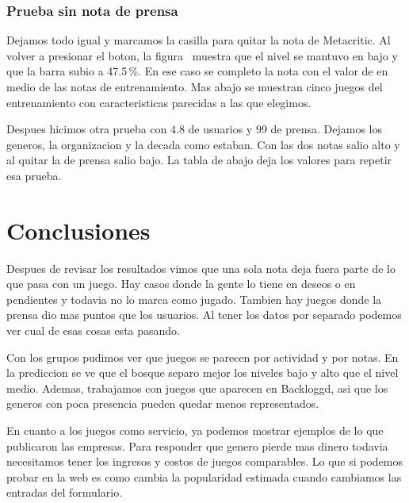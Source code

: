 
\subsubsection*{Prueba sin nota de prensa}
Dejamos todo igual y marcamos la casilla para quitar la nota de Metacritic. Al volver a presionar el boton, la figura~ muestra que el nivel se mantuvo en bajo y que la barra subio a 47.5\,\%. En ese caso se completo la nota con el valor de en medio de las notas de entrenamiento. Mas abajo se muestran cinco juegos del entrenamiento con caracteristicas parecidas a las que elegimos.


Despues hicimos otra prueba con 4.8 de usuarios y 99 de prensa. Dejamos los generos, la organizacion y la decada como estaban. Con las dos notas salio alto y al quitar la de prensa salio bajo. La tabla de abajo deja los valores para repetir esa prueba.

\EscenariosNotas

\section{Conclusiones}
Despues de revisar los resultados vimos que una sola nota deja fuera parte de lo que pasa con un juego. Hay casos donde la gente lo tiene en deseos o en pendientes y todavia no lo marca como jugado. Tambien hay juegos donde la prensa dio mas puntos que los usuarios. Al tener los datos por separado podemos ver cual de esas cosas esta pasando.

Con los grupos pudimos ver que juegos se parecen por actividad y por notas. En la prediccion se ve que el bosque separo mejor los niveles bajo y alto que el nivel medio. Ademas, trabajamos con juegos que aparecen en Backloggd, asi que los generos con poca presencia pueden quedar menos representados.

En cuanto a los juegos como servicio, ya podemos mostrar ejemplos de lo que publicaron las empresas. Para responder que genero pierde mas dinero todavia necesitamos tener los ingresos y costos de juegos comparables. Lo que si podemos probar en la web es como cambia la popularidad estimada cuando cambiamos las entradas del formulario.

